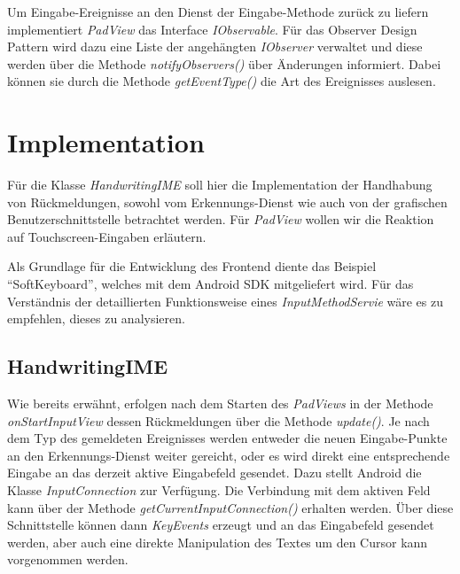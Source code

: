 Um Eingabe-Ereignisse an den Dienst der Eingabe-Methode zurück zu liefern implementiert \emph{PadView} das Interface \emph{IObservable}. Für das Observer Design Pattern wird dazu eine Liste der angehängten \emph{IObserver} verwaltet und diese werden über die Methode \emph{notifyObservers()} über Änderungen informiert. Dabei können sie durch die Methode \emph{getEventType()} die Art des Ereignisses auslesen.

\section{Implementation}

Für die Klasse \emph{HandwritingIME} soll hier die Implementation der Handhabung von Rückmeldungen, sowohl vom Erkennungs-Dienst wie auch von der grafischen Benutzerschnittstelle betrachtet werden. Für \emph{PadView} wollen wir die Reaktion auf Touchscreen-Eingaben erläutern.

Als Grundlage für die Entwicklung des Frontend diente das Beispiel ``SoftKeyboard'', welches mit dem Android SDK mitgeliefert wird. Für das Verständnis der detaillierten Funktionsweise eines \emph{InputMethodServie} wäre es zu empfehlen, dieses zu analysieren.

\subsection{HandwritingIME}

Wie bereits erwähnt, erfolgen nach dem Starten des \emph{PadViews} in der Methode \emph{onStartInputView} dessen Rückmeldungen über die Methode \emph{update()}. Je nach dem Typ des gemeldeten Ereignisses werden entweder die neuen Eingabe-Punkte an den Erkennungs-Dienst weiter gereicht, oder es wird direkt eine entsprechende Eingabe an das derzeit aktive Eingabefeld gesendet. Dazu stellt Android die Klasse \emph{InputConnection} zur Verfügung. Die Verbindung mit dem aktiven Feld kann über der Methode \emph{getCurrentInputConnection()} erhalten werden. Über diese Schnittstelle können dann \emph{KeyEvents} erzeugt und an das Eingabefeld gesendet werden, aber auch eine direkte Manipulation des Textes um den Cursor kann vorgenommen werden.


